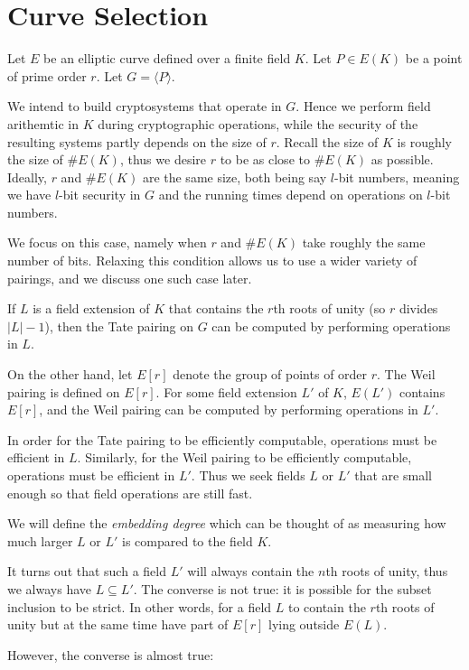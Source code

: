 \chapter{Curve Selection}

Let $E$ be an elliptic curve defined over a finite field $K$.
Let $P \in E(K)$ be a point of prime order $r$. Let $G = \langle P \rangle$.

We intend to build cryptosystems that operate in $G$. Hence
we perform field arithemtic in $K$ during cryptographic operations,
while the security of the resulting systems partly depends on the size of $r$.
Recall the size of $K$ is roughly the size of $\#E(K)$,
thus we desire $r$ to be as close to $\#E(K)$ as possible. Ideally,
$r$ and $\#E(K)$ are the same size, both being say $l$-bit numbers,
meaning we have $l$-bit security
in $G$ and the running times depend on operations on $l$-bit numbers.

We focus on this case, namely when
$r$ and $\#E(K)$ take roughly the same number of
bits. Relaxing this condition
allows us to use a wider variety of pairings, and we discuss one
such case later.

If $L$ is a field extension of $K$
that contains the $r$th roots of unity (so $r$ divides $|L| - 1$),
then the Tate pairing
on $G$ can be computed by performing operations in $L$.

On the other hand, let $E[r]$ denote the group of points of order $r$.
The Weil pairing is defined on $E[r]$. For some field extension
$L'$ of $K$, $E(L')$ contains $E[r]$, and the Weil pairing can be
computed by performing operations in $L'$.

In order for the Tate pairing to be efficiently computable,
operations must be efficient in $L$.
Similarly, for the Weil pairing to be efficiently
computable, operations must be efficient in $L'$.
Thus we seek fields $L$ or $L'$ that are small enough so that field
operations are still fast.

We will define the \emph{embedding degree} which can be thought of as measuring
how much larger $L$ or $L'$ is compared to the field $K$.

It turns out that such a field $L'$ will always contain the $n$th
roots of unity, thus we always have $L \subseteq L'$.
The converse is not true: it is possible for the subset inclusion to be strict.
In other words, for a field $L$ to contain the $r$th roots of unity but
at the same time have part of $E[r]$ lying outside $E(L)$.

However, the converse is almost true:

